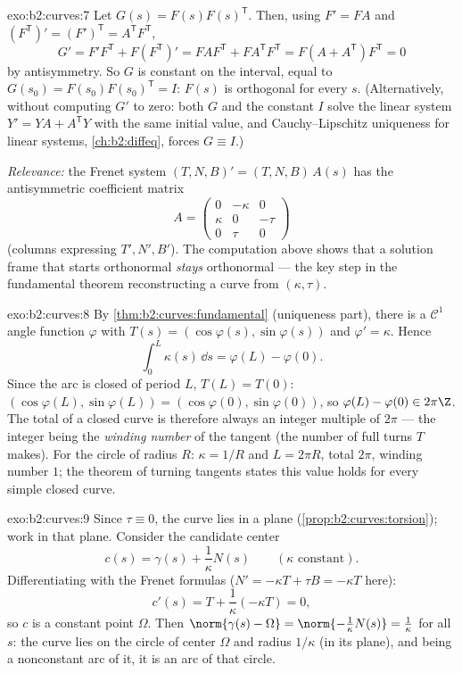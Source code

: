 \begin{solution}{exo:b2:curves:7}
Let $G(s) = F(s)F(s)^{\mathsf T}$. Then, using $F' = FA$ and
$(F^{\mathsf T})' = (F')^{\mathsf T} = A^{\mathsf T}F^{\mathsf T}$,
\[
G' = F'F^{\mathsf T} + F(F^{\mathsf T})'
= FAF^{\mathsf T} + FA^{\mathsf T}F^{\mathsf T}
= F(A + A^{\mathsf T})F^{\mathsf T} = 0
\]
by antisymmetry. So $G$ is constant on the interval, equal to
$G(s_0) = F(s_0)F(s_0)^{\mathsf T} = I$: $F(s)$ is orthogonal for
every $s$. (Alternatively, without computing $G'$ to zero: both
$G$ and the constant $I$ solve the linear system $Y' = YA +
A^{\mathsf T}Y$ with the same initial value, and Cauchy--Lipschitz
uniqueness for linear systems, \cref{ch:b2:diffeq}, forces $G
\equiv I$.)

\emph{Relevance:} the Frenet system $(T, N, B)' = (T, N, B)\,A(s)$
has the antisymmetric coefficient matrix
\[
A = \begin{pmatrix} 0 & -\kappa & 0\\ \kappa & 0 & -\tau\\
0 & \tau & 0\end{pmatrix}
\]
(columns expressing $T', N', B'$). The computation above shows
that a solution frame that starts orthonormal \emph{stays}
orthonormal --- the key step in the fundamental theorem
reconstructing a curve from $(\kappa, \tau)$.
\end{solution}

\begin{solution}{exo:b2:curves:8}
By \cref{thm:b2:curves:fundamental} (uniqueness part), there is a
$\mathcal{C}^1$ angle function $\varphi$ with $T(s) =
(\cos\varphi(s), \sin\varphi(s))$ and $\varphi' = \kappa$. Hence
\[
\int_0^L \kappa(s)\,\dd s = \varphi(L) - \varphi(0) .
\]
Since the arc is closed of period $L$, $T(L) = T(0)$:
$(\cos\varphi(L), \sin\varphi(L)) = (\cos\varphi(0),
\sin\varphi(0))$, so $\varphi(L) - \varphi(0) \in 2\pi\Z$. The
total  of a closed curve is therefore always an integer
multiple of $2\pi$ --- the integer being the \emph{winding number}
of the tangent (the number of full turns $T$ makes). For the
circle of radius $R$: $\kappa = 1/R$ and $L = 2\pi R$, total
 $2\pi$, winding number $1$; the theorem of turning
tangents states this value holds for every simple closed curve.
\end{solution}

\begin{solution}{exo:b2:curves:9}
Since $\tau \equiv 0$, the curve lies in a plane
(\cref{prop:b2:curves:torsion}); work in that plane. Consider the
candidate center
\[
c(s) = \gamma(s) + \frac{1}{\kappa}N(s)
\qquad (\kappa \text{ constant}).
\]
Differentiating with the Frenet formulas ($N' = -\kappa T + \tau B
= -\kappa T$ here):
\[
c'(s) = T + \frac1\kappa(-\kappa T) = 0 ,
\]
so $c$ is a constant point $\Omega$. Then $\norm{\gamma(s) -
\Omega} = \norm{-\frac1\kappa N(s)} = \frac1\kappa$ for all $s$:
the curve lies on the circle of center $\Omega$ and radius
$1/\kappa$ (in its plane), and being a nonconstant arc of it, it
is an arc of that circle.
\end{solution}

